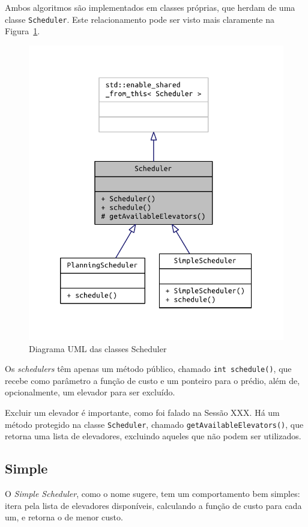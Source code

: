 Ambos algoritmos são implementados em classes próprias, que herdam de uma classe
\texttt{Scheduler}. Este relacionamento pode ser visto mais claramente na
Figura~\ref{fig:model:schedulers:uml:base}.

\begin{figure}[htb]
  \centering
  \includegraphics{doc/latex/class_scheduler__inherit__graph}
  \caption{Diagrama UML das classes Scheduler}
  \label{fig:model:schedulers:uml:base}
\end{figure}

Os \textit{schedulers} têm apenas um método público, chamado \texttt{int
  schedule()}, que recebe como parâmetro a função de custo e um ponteiro para o
prédio, além de, opcionalmente, um elevador para ser excluído.

Excluir um elevador é importante, como foi falado na Sessão XXX. Há um método
protegido na classe \texttt{Scheduler}, chamado
\texttt{getAvailableElevators()}, que retorna uma lista de elevadores, excluindo
aqueles que não podem ser utilizados.

\subsection{\label{model:schedulers:simple}Simple}
O \textit{Simple Scheduler}, como o nome sugere, tem um comportamento bem
simples: itera pela lista de elevadores disponíveis, calculando a função de
custo para cada um, e retorna o de menor custo.

